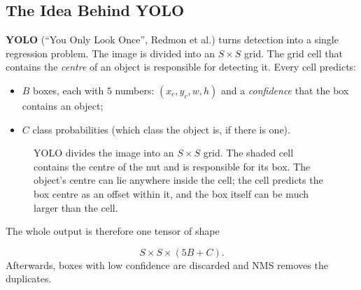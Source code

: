 \documentclass[12pt, a4paper]{article}
\begin{document}
\subsection{The Idea Behind YOLO}

\textbf{YOLO} (``You Only Look Once'', Redmon et al.) turns detection into
a single regression problem. The image is divided into an $S \times S$ grid.
The grid cell that contains the \emph{centre} of an object is responsible
for detecting it. Every cell predicts:
\begin{itemize}[nosep]
  \item $B$ boxes, each with $5$ numbers: $(x_c, y_c, w, h)$ and a
        \emph{confidence} that the box contains an object;
  \item $C$ class probabilities (which class the object is, if there is one).
\end{itemize}

\begin{figure}[H]
  \centering
  \caption{YOLO divides the image into an $S \times S$ grid. The shaded cell
    contains the centre of the nut and is responsible for its box. The
    object's centre can lie anywhere inside the cell; the cell predicts the
    box centre as an offset within it, and the box itself can be much larger
    than the cell.}
  \label{fig:yolo}
\end{figure}

The whole output is therefore one tensor of shape
\begin{resultbox}
  \[
    S \times S \times (5B + C).
  \]
  Afterwards, boxes with low confidence are discarded and NMS removes the
  duplicates.
\end{resultbox}
\end{document}
